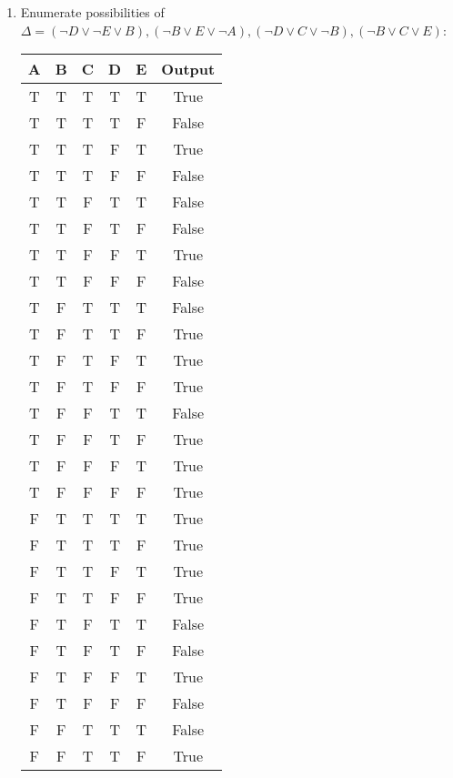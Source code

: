 \documentclass{article}
\begin{document}
 \section{}
 \begin{enumerate}
     \item Enumerate possibilities of $\Delta = (\lnot D \lor \lnot E \lor B),(\lnot B \lor E \lor \lnot A),(\lnot D \lor C \lor \lnot B),(\lnot B \lor C \lor E)$:
     \begin{center}
           \begin{tabular}{ |c|c|c|c|c|c| }
            \hline
             A&B&C&D&E&Output \\ 
             \hline
             T&T&T&T&T&True \\
            T&T&T&T&F&False \\
            T&T&T&F&T&True \\
            T&T&T&F&F&False \\
            \hline
            T&T&F&T&T&False \\
            T&T&F&T&F&False \\
            T&T&F&F&T&True \\
            T&T&F&F&F&False \\
            \hline
            T&F&T&T&T&False \\
            T&F&T&T&F&True \\
            T&F&T&F&T&True \\
            T&F&T&F&F&True \\
            \hline
            T&F&F&T&T&False \\
            T&F&F&T&F&True \\
            T&F&F&F&T&True \\
            T&F&F&F&F&True \\
            \hline
            F&T&T&T&T&True \\
            F&T&T&T&F&True \\
            F&T&T&F&T&True \\
            F&T&T&F&F&True \\
            \hline
            F&T&F&T&T&False \\
            F&T&F&T&F&False \\
            F&T&F&F&T&True \\
            F&T&F&F&F&False \\
            \hline
            F&F&T&T&T&False \\
            F&F&T&T&F&True \\

\end{tabular}
\end{center}
\end{enumerate}
\end{document}
